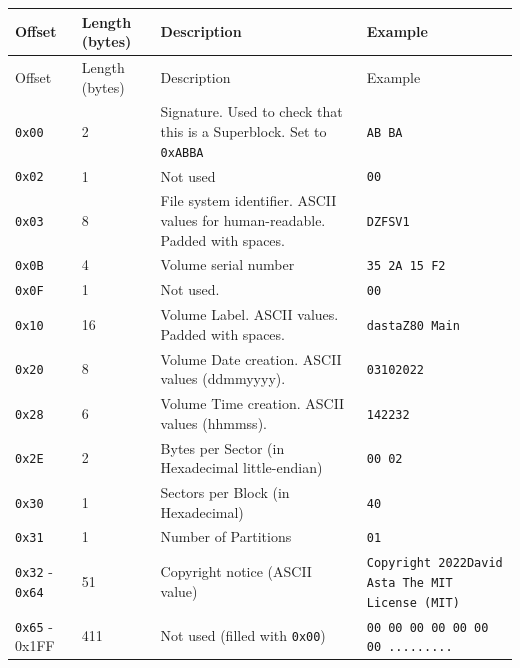 \documentclass[a4paper,11pt]{article}
\begin{document}
        \begin{longtable}{ |m{2.2cm}|m{1.3cm}|m{6cm}|m{2.7cm}| }
            \hline
            \rowcolor{lightgray}
            Offset & Length (bytes) & Description & Example\\
            \hline
            \endfirsthead

            \hline
            \rowcolor{lightgray}
            Offset & Length (bytes) & Description & Example\\
            \hline
            \endhead

            \texttt{0x00} & 2 & Signature. Used to check that this is a
            Superblock. Set to \texttt{0xABBA} & \texttt{AB BA}\\
            \hline
            \texttt{0x02} & 1 & Not used & \texttt{00}\\
            \hline
            \texttt{0x03} & 8 & File system identifier. ASCII values for
            human-readable. Padded with spaces. & \texttt{DZFSV1}\\
            \hline
            \texttt{0x0B} & 4 & Volume serial number & \texttt{35 2A 15 F2}\\
            \hline
            \texttt{0x0F} & 1 & Not used. & \texttt{00}\\
            \hline
            \texttt{0x10} & 16 & Volume Label. ASCII values. Padded with spaces. 
            & \texttt{dastaZ80 Main}\\
            \hline
            \texttt{0x20} & 8 & Volume Date creation. ASCII values (ddmmyyyy).
            & \texttt{03102022}\\
            \hline
            \texttt{0x28} & 6 & Volume Time creation. ASCII values (hhmmss).
            & \texttt{142232}\\
            \hline
            \texttt{0x2E} & 2 & Bytes per Sector (in Hexadecimal little-endian)
            & \texttt{00 02}\\
            \hline
            \texttt{0x30} & 1 & Sectors per Block (in Hexadecimal) & \texttt{40}\\
            \hline
            \texttt{0x31} & 1 & Number of Partitions & \texttt{01}\\
            \hline
            \texttt{0x32} - \texttt{0x64} & 51 & Copyright notice (ASCII value)
            & \texttt{Copyright 2022David Asta The MIT License (MIT)}\\
            \hline
            \texttt{0x65} - 0x1FF & 411 & Not used (filled with \texttt{0x00})
            & \texttt{00 00 00 00 00 00 00 .........}\\
            \hline
        \end{longtable}
\end{document}
